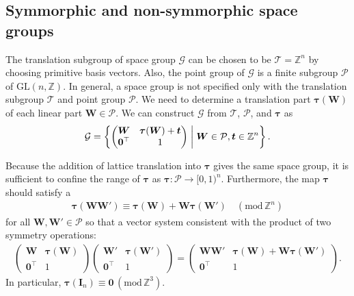 \subsection{Symmorphic and non-symmorphic space groups}

The translation subgroup of space group $\mathcal{G}$ can be chosen to be $\mathcal{T} = \mathbb{Z}^{n}$ by choosing primitive basis vectors.
Also, the point group of $\mathcal{G}$ is a finite subgroup $\mathcal{P}$ of $\mathrm{GL}(n, \mathbb{Z})$.
In general, a space group is not specified only with the translation subgroup $\mathcal{T}$ and point group $\mathcal{P}$.
We need to determine a translation part $\bm{\tau}(\bm{W})$ of each linear part $\bm{W} \in \mathcal{P}$.
We can construct $\mathcal{G}$ from $\mathcal{T}$, $\mathcal{{P}}$, and $\bm{\tau}$ as
\begin{align}
  \mathcal{G} = \left\{ 
    \begin{pmatrix}
      \bm{W} & \bm{\tau}(\bm{W}) + \bm{t} \\
      \bm{0}^{\top} & 1 \\
    \end{pmatrix}
   \mathrel{}\middle|\mathrel{} 
    \bm{W} \in \mathcal{P}, \bm{t} \in \mathbb{Z}^{n}
   \right\}.
\end{align}

Because the addition of lattice translation into $\bm{\tau}$ gives the same space group, it is sufficient to confine the range of $\bm{\tau}$ as $\bm{\tau}: \mathcal{P} \to [0, 1)^{n}$.
Furthermore, the map $\bm{\tau}$ should satisfy a 
\begin{align}
  \label{eq:cocycle_condition}
  \bm{\tau}(\bm{W}\bm{W}') \equiv \bm{\tau}(\bm{W}) + \bm{W} \bm{\tau}(\bm{W}') \quad ( \mathrm{mod} \, \mathbb{Z}^{n})
\end{align}
for all $\bm{W}, \bm{W}' \in \mathcal{P}$ so that a vector system consistent with the product of two symmetry operations:
\begin{align*}
  \begin{pmatrix}
    \bm{W} & \bm{\tau}(\bm{W}) \\
    \bm{0}^{\top} & 1
  \end{pmatrix}
  \begin{pmatrix}
    \bm{W}' & \bm{\tau}(\bm{W}') \\
    \bm{0}^{\top} & 1
  \end{pmatrix}
  =
  \begin{pmatrix}
    \bm{W}\bm{W}' & \bm{\tau}(\bm{W}) + \bm{W} \bm{\tau}(\bm{W}') \\
    \bm{0}^{\top} & 1
  \end{pmatrix}.
\end{align*}
In particular, $\bm{\tau}(\bm{I}_{n}) \equiv \bm{0} \, (\mathrm{mod}\, \mathbb{Z}^{3})$.

